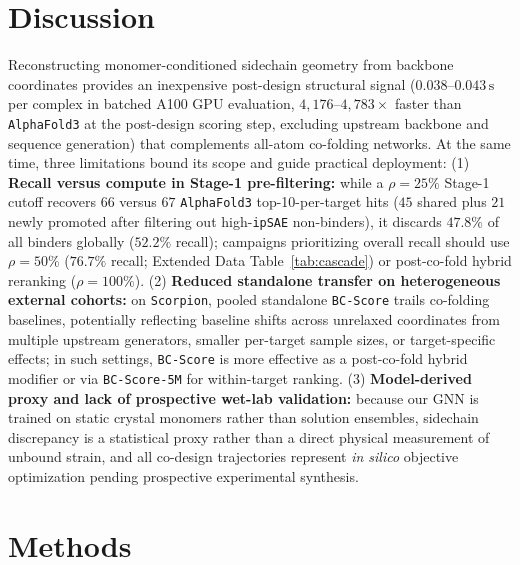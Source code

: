 \documentclass[10pt,twocolumn]{article}
\begin{document}
\section{Discussion}
Reconstructing monomer-conditioned sidechain geometry from backbone coordinates provides an inexpensive post-design structural signal ($0.038\text{--}0.043\,\text{s}$ per complex in batched A100 GPU evaluation, $4,176\text{--}4,783\times$ faster than \texttt{AlphaFold3} at the post-design scoring step, excluding upstream backbone and sequence generation) that complements all-atom co-folding networks. At the same time, three limitations bound its scope and guide practical deployment: (1) \textbf{Recall versus compute in Stage-1 pre-filtering:} while a $\rho = 25\%$ Stage-1 cutoff recovers $66$ versus $67$ \texttt{AlphaFold3} top-10-per-target hits ($45$ shared plus $21$ newly promoted after filtering out high-\texttt{ipSAE} non-binders), it discards $47.8\%$ of all binders globally ($52.2\%$ recall); campaigns prioritizing overall recall should use $\rho = 50\%$ ($76.7\%$ recall; Extended Data Table~\ref{tab:cascade}) or post-co-fold hybrid reranking ($\rho = 100\%$). (2) \textbf{Reduced standalone transfer on heterogeneous external cohorts:} on \texttt{Scorpion}, pooled standalone \texttt{BC-Score} trails co-folding baselines, potentially reflecting baseline shifts across unrelaxed coordinates from multiple upstream generators, smaller per-target sample sizes, or target-specific effects; in such settings, \texttt{BC-Score} is more effective as a post-co-fold hybrid modifier or via \texttt{BC-Score-5M} for within-target ranking. (3) \textbf{Model-derived proxy and lack of prospective wet-lab validation:} because our GNN is trained on static crystal monomers rather than solution ensembles, sidechain discrepancy is a statistical proxy rather than a direct physical measurement of unbound strain, and all co-design trajectories represent \textit{in silico} objective optimization pending prospective experimental synthesis.

\section{Methods}
\end{document}
